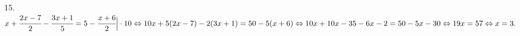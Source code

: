 15. $x+\cfrac{2x-7}{2}-\cfrac{3x+1}{5}=5-\cfrac{x+6}{2}\Big|\cdot10\Leftrightarrow10x+5(2x-7)-2(3x+1)=50-5(x+6)\Leftrightarrow
10x+10x-35-6x-2=50-5x-30\Leftrightarrow 19x=57\Leftrightarrow x=3.$\\
